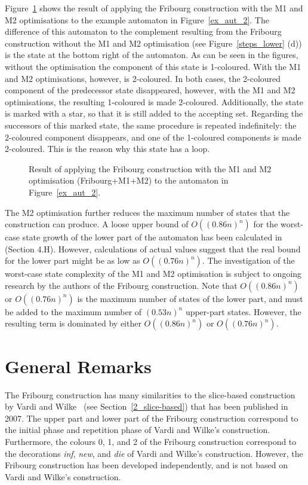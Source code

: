 Figure~\ref{complement_with_m2} shows the result of applying the Fribourg construction with the M1 and M2 optimisations to the example automaton in Figure~\ref{ex_aut_2}. The difference of this automaton to the complement resulting from the Fribourg construction without the M1 and M2 optimisation (see Figure~\ref{steps_lower} (d)) is the state at the bottom right of the automaton. As can be seen in the figures, without the optimisation the component  of this state is 1-coloured. With the M1 and M2 optimisations, however,  is 2-coloured. In both cases, the 2-coloured component of the predecessor state disappeared, however, with the M1 and M2 optimisations, the resulting 1-coloured  is made 2-coloured. Additionally, the state is marked with a star, so that it is still added to the accepting set. Regarding the successors of this marked state, the same procedure is repeated indefinitely: the 2-coloured component disappears, and one of the 1-coloured components is made 2-coloured. This is the reason why this state has a loop.

\begin{figure}[htb]
\centering
\ComplementWithMTwo
\caption{Result of applying the Fribourg construction with the M1 and M2 optimisation (Fribourg+M1+M2) to the automaton in Figure~\ref{ex_aut_2}.}
\label{complement_with_m2}
\end{figure}

The M2 optimisation further reduces the maximum number of states that the construction can produce. A loose upper bound of $O((0.86n)^n)$ for the worst-case state growth of the lower part of the automaton has been calculated in \cite{2014_joel_ulrich} (Section 4.H). However, calculations of actual values suggest that the real bound for the lower part might be as low as $O((0.76n)^n)$. The investigation of the worst-case state complexity of the M1 and M2 optimisation is subject to ongoing research by the authors of the Fribourg construction. Note that $O((0.86n)^n)$ or $O((0.76n)^n)$ is the maximum number of states of the lower part, and must be added to the maximum number of $(0.53n)^n$ upper-part states. However, the resulting term is dominated by either $O((0.86n)^n)$ or $O((0.76n)^n)$.


\section{General Remarks}
\label{3_remarks}
The Fribourg construction has many similarities to the slice-based construction by Vardi and Wilke~\cite{vardi2007automata} (see Section~\ref{2_slice-based}) that has been published in 2007. The upper part and lower part of the Fribourg construction correspond to the initial phase and repetition phase of Vardi and Wilke's construction. Furthermore, the colours 0, 1, and 2 of the Fribourg construction correspond to the decorations \textit{inf}, \textit{new}, and \textit{die} of Vardi and Wilke's construction. However, the Fribourg construction has been developed independently, and is not based on Vardi and Wilke's construction.

